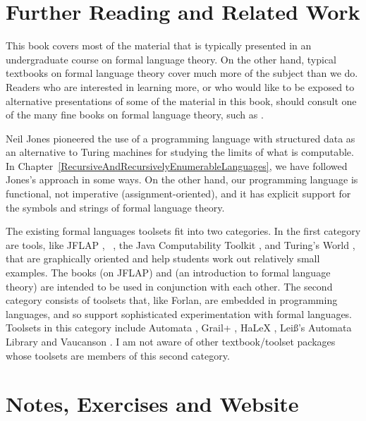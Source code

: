 \section*{Further Reading and Related Work}
\label{FurtherReadingAndRelatedWork}

This book covers most of the material that is typically presented in
an undergraduate course on formal language theory.  On the other hand,
typical textbooks on formal language theory cover much more of the
subject than we do.  Readers who are interested in learning more, or
who would like to be exposed to alternative presentations of some of
the material in this book, should consult one of the many fine books
on formal language theory, such as
\cite{HopcroftMotwaniUllman01,Kozen97,LewisPapadimitriou98,Martin91,Linz01}.

Neil Jones \cite{Jones97} pioneered the use of a programming language
with structured data as an alternative to Turing machines for studying
the limits of what is computable.  In
Chapter~\ref{RecursiveAndRecursivelyEnumerableLanguages}, we have
followed Jones's approach in some ways.  On the other hand, our
programming language is functional, not imperative
(assignment-oriented), and it has explicit support for the symbols and
strings of formal language theory.

The existing formal languages toolsets fit into two categories.  In the
first category are tools, like JFLAP \cite{Rodger97,Rodger00,Rodger06},
\Pate\ \cite{Rodger97,Rodger00}, the Java Computability Toolkit
\cite{Robinson99}, and Turing's World \cite{BarwiseEtchemendy93}, that
are graphically oriented and help students work out relatively small
examples.  The books \cite{Rodger06} (on JFLAP) and \cite{Linz01} (an
introduction to formal language theory) are intended to be used in
conjunction with each other.  The second category consists of toolsets
that, like Forlan, are embedded in programming languages, and so
support sophisticated experimentation with formal languages.  Toolsets
in this category include Automata \cite{Sutner92}, Grail+
\cite{Raymond94,Grail}, HaLeX \cite{Saraiva02}, Lei\ss's Automata
Library \cite{Leiss} and Vaucanson \cite{Lombardy04}.  I am not
aware of other textbook/toolset packages whose toolsets are
members of this second category.

\section*{Notes, Exercises and Website}
\label{NotesAndExercisesAndWebsite}

